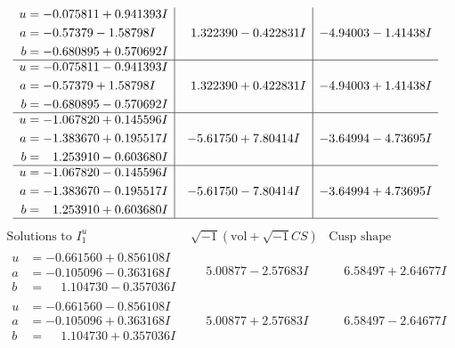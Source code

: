 \documentclass[1p]{elsarticle_modified}
\theoremstyle{definition}
\newcommand{\I}{\sqrt{-1}}
\begin{document}
$$\begin{array}{c|c|c}
\begin{aligned}
u &= -0.075811 + 0.941393 I \\
a &= -0.57379 - 1.58798 I \\
b &= -0.680895 + 0.570692 I\end{aligned}
 & \phantom{-}1.322390 - 0.422831 I & -4.94003 - 1.41438 I \\ \hline\begin{aligned}
u &= -0.075811 - 0.941393 I \\
a &= -0.57379 + 1.58798 I \\
b &= -0.680895 - 0.570692 I\end{aligned}
 & \phantom{-}1.322390 + 0.422831 I & -4.94003 + 1.41438 I \\ \hline\begin{aligned}
u &= -1.067820 + 0.145596 I \\
a &= -1.383670 + 0.195517 I \\
b &= \phantom{-}1.253910 - 0.603680 I\end{aligned}
 & -5.61750 + 7.80414 I & -3.64994 - 4.73695 I \\ \hline\begin{aligned}
u &= -1.067820 - 0.145596 I \\
a &= -1.383670 - 0.195517 I \\
b &= \phantom{-}1.253910 + 0.603680 I\end{aligned}
 & -5.61750 - 7.80414 I & -3.64994 + 4.73695 I\\
 \hline 
 \end{array}$$\newpage$$\begin{array}{c|c|c}  
\text{Solutions to }I^u_{1}& \I (\text{vol} + \sqrt{-1}CS) & \text{Cusp shape}\\
 \hline 
\begin{aligned}
u &= -0.661560 + 0.856108 I \\
a &= -0.105096 - 0.363168 I \\
b &= \phantom{-}1.104730 - 0.357036 I\end{aligned}
 & \phantom{-}5.00877 - 2.57683 I & \phantom{-}6.58497 + 2.64677 I \\ \hline\begin{aligned}
u &= -0.661560 - 0.856108 I \\
a &= -0.105096 + 0.363168 I \\
b &= \phantom{-}1.104730 + 0.357036 I\end{aligned}
 & \phantom{-}5.00877 + 2.57683 I & \phantom{-}6.58497 - 2.64677 I \\ \hline\begin{aligned}

\end{aligned}
\end{array}$$
\end{document}
